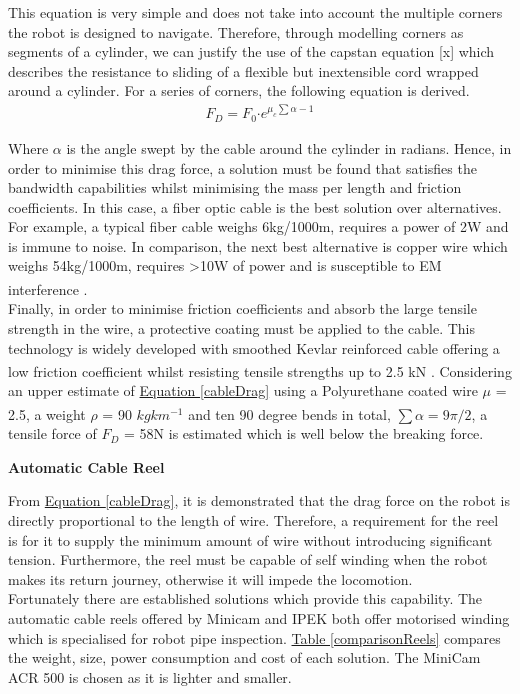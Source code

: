 \documentclass[11pt]{article}		%
\newcommand{\supercite}[1]{\textsuperscript{\cite{#1}}}		%
\newcommand{\equationref}[1]{\hyperref[#1]{Equation \ref*{#1}}}     %
\newcommand{\tableref}[1]{\hyperref[#1]{Table \ref*{#1}}}     %
\begin{document}
	        This equation is very simple and does not take into account the multiple corners the robot is designed to navigate.
	        Therefore, through modelling corners as segments of a cylinder, we can justify the use of the capstan equation [x] which describes the resistance to sliding of a flexible but inextensible cord wrapped around a cylinder. 
	        For a series of corners, the following equation is derived.
	        \begin{align}
	                F_D = F_0 \boldsymbol{\cdot} {e}^{\mu_c \sum \alpha -1} \label{cableDrag}
	        \end{align}
	
			Where $\alpha$ is the angle swept by the cable around the cylinder in radians. 
		    Hence, in order to minimise this drag force, a solution must be found that satisfies the bandwidth capabilities whilst minimising the mass per length and friction coefficients.  
		    In this case, a fiber optic cable is the best solution over alternatives. 
		    For example, a typical fiber cable weighs 6kg/1000m, requires a power of 2W and is immune to noise. 
		    In comparison, the next best alternative is copper wire which weighs 54kg/1000m, requires >10W of power and is susceptible to EM interference \supercite{wiring}.
		    \\
	        Finally, in order to minimise friction coefficients and absorb the large tensile strength in the wire, a protective coating must be applied to the cable. 
		    This technology is widely developed with smoothed Kevlar reinforced cable offering a low friction coefficient whilst resisting tensile strengths up to 2.5 kN \supercite{macartney}. 
		    Considering an upper estimate of \equationref{cableDrag} using a Polyurethane coated wire $\mu$ = 2.5, a weight $\rho$ = 90 $kgkm^{-1}$ \supercite{macartney} and ten 90 degree bends in total, $\sum \alpha = 9\pi/2$, a tensile force of $F_D$ = 58N is estimated which is well below the breaking force.  
		    
		    \textbf{Automatic Cable Reel}
	
	        From \equationref{cableDrag}, it is demonstrated that the drag force on the robot is directly proportional to the length of wire. 
	        Therefore, a requirement for the reel is for it to supply the minimum amount of wire without introducing significant tension. 
	        Furthermore, the reel must be capable of self winding when the robot makes its return journey, otherwise it will impede the locomotion.
	        \\ 
	        \hspace*{3ex}Fortunately there are established solutions which provide this capability. 
	        The automatic cable reels offered by Minicam and IPEK both offer motorised winding which is specialised for robot pipe inspection. 
	        \tableref{comparisonReels} compares the weight, size, power consumption and cost of each solution. 
	        The MiniCam ACR 500 is chosen as it is lighter and smaller. 
	
\end{document}
